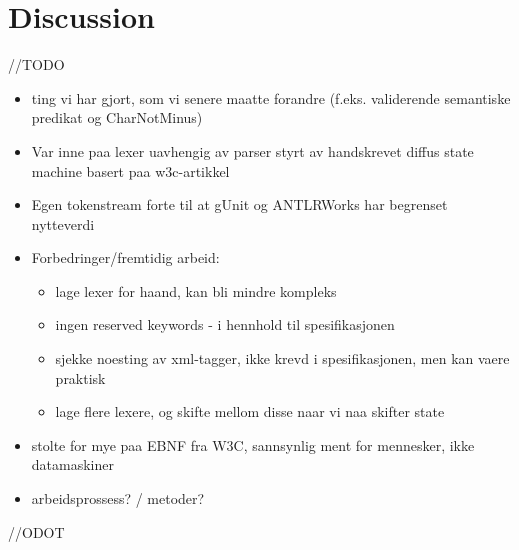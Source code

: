 \chapter{Discussion}

//TODO

\begin{itemize}
\item ting vi har gjort, som vi senere maatte forandre (f.eks. validerende semantiske predikat og CharNotMinus)
\item Var inne paa lexer uavhengig av parser styrt av handskrevet diffus state machine basert paa w3c-artikkel
\item Egen tokenstream forte til at gUnit og ANTLRWorks har begrenset nytteverdi
\item Forbedringer/fremtidig arbeid:
\begin{itemize}
\item lage lexer for haand, kan bli mindre kompleks
\item ingen reserved keywords - i hennhold til spesifikasjonen
\item sjekke noesting av xml-tagger, ikke krevd i spesifikasjonen, men kan vaere praktisk
\item lage flere lexere, og skifte mellom disse naar vi naa skifter state
\end{itemize}
\item stolte for mye paa EBNF fra W3C, sannsynlig ment for mennesker, ikke datamaskiner
\item arbeidsprossess? / metoder?
\end{itemize}


//ODOT
